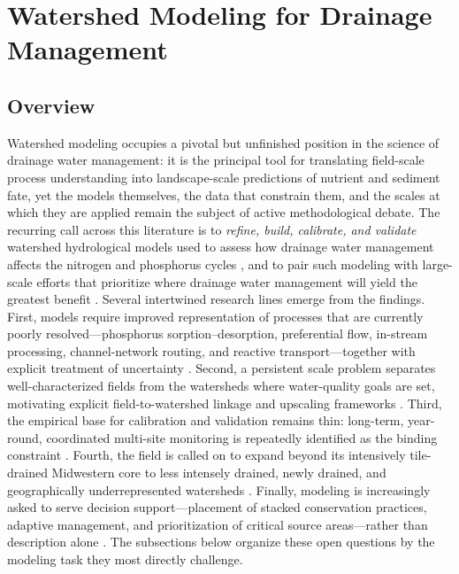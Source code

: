 \documentclass[11pt]{article}
\begin{document}
\section*{Watershed Modeling for Drainage Management}

\subsection{Overview}

Watershed modeling occupies a pivotal but unfinished position in the science of drainage water management: it is the principal tool for translating field-scale process understanding into landscape-scale predictions of nutrient and sediment fate, yet the models themselves, the data that constrain them, and the scales at which they are applied remain the subject of active methodological debate. The recurring call across this literature is to \emph{refine, build, calibrate, and validate} watershed hydrological models used to assess how drainage water management affects the nitrogen and phosphorus cycles \parencite{Sunohara2015}, and to pair such modeling with large-scale efforts that prioritize where drainage water management will yield the greatest benefit \parencite{Ross2016}. Several intertwined research lines emerge from the findings. First, models require improved representation of processes that are currently poorly resolved---phosphorus sorption--desorption, preferential flow, in-stream processing, channel-network routing, and reactive transport---together with explicit treatment of uncertainty \parencite{Wang2020b,Kujawa2020}. Second, a persistent scale problem separates well-characterized fields from the watersheds where water-quality goals are set, motivating explicit field-to-watershed linkage and upscaling frameworks \parencite{Williams2015,Kyllmar2023}. Third, the empirical base for calibration and validation remains thin: long-term, year-round, coordinated multi-site monitoring is repeatedly identified as the binding constraint \parencite{Christianson2015,Bauwe2020}. Fourth, the field is called on to expand beyond its intensively tile-drained Midwestern core to less intensely drained, newly drained, and geographically underrepresented watersheds \parencite{Kujawa2020,Christianson2015}. Finally, modeling is increasingly asked to serve decision support---placement of stacked conservation practices, adaptive management, and prioritization of critical source areas---rather than description alone \parencite{Kröger2013,Tomer2015}. The subsections below organize these open questions by the modeling task they most directly challenge.
\end{document}
